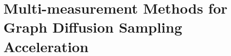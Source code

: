 \section{Multi-measurement Methods for Graph Diffusion Sampling Acceleration}
\label{sec: multiprox}